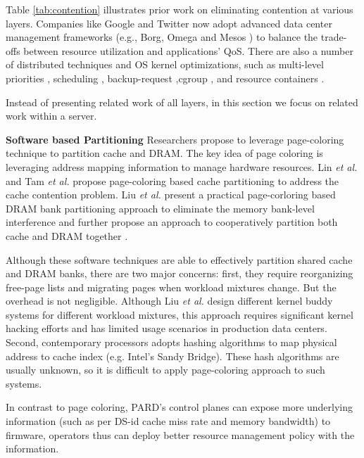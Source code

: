 Table \ref{tab:contention} illustrates prior work on eliminating contention at various layers.
Companies like Google and Twitter now adopt advanced data center management frameworks
(e.g., Borg\cite{borg:2015}, Omega \cite{Schwarzkopf_omega_2013}
and Mesos \cite{Hindman:2011:Mesos}) to balance the trade-offs between
resource utilization and applications' QoS.
There are also a number of distributed techniques and OS kernel
optimizations, such as multi-level priorities \cite{google_trace},
scheduling \cite{delimitrou_paragon:_2013, delimitrou_quasar:_2014,  mars_heterogeneity_2011,
kozyrakis_reconciling_2014, Novakovi:ATC2013}, backup-request \cite{dean_tail_2013},cgroup \cite{cgroup},
and resource containers \cite{lxc}.

Instead of presenting related work of all layers, in this section we focus on related work within a server.

\textbf{Software based Partitioning} Researchers propose to leverage
page-coloring technique to partition cache and DRAM.
The key idea of page coloring is leveraging address mapping information to manage hardware
resources.
Lin \emph{et al.} \cite{lin_gaining_2008}
and Tam \emph{et al.} \cite{tam_managing_2007} propose page-coloring based cache
partitioning to address the cache contention problem.
Liu \emph{et al.} \cite{liu_software_2012} present a practical page-corloring
based DRAM bank partitioning approach to eliminate the memory bank-level
interference and further propose an approach to cooperatively partition
both cache and DRAM together \cite{Liu:2014:ISCA}.

Although these software techniques
are able to effectively partition shared cache and DRAM banks, there are two major
concerns: first, they require reorganizing free-page lists and migrating pages
when workload mixtures change. But the overhead is not negligible. 
Although Liu \emph{et al.} \cite{Liu:2014:ISCA}
design different kernel buddy systems for different workload mixtures,
this approach requires significant kernel hacking efforts and has limited usage
scenarios in production data centers. Second, contemporary processors 
adopts hashing algorithms to map 
physical address to cache index (e.g. Intel's Sandy Bridge). These hash algorithms are 
usually unknown, so it is difficult to apply page-coloring
approach to such systems.

In contrast to page coloring, PARD's control planes can expose more underlying information (such as per DS-id cache miss rate and memory bandwidth) to firmware, operators thus
can deploy better resource management policy with the information.


